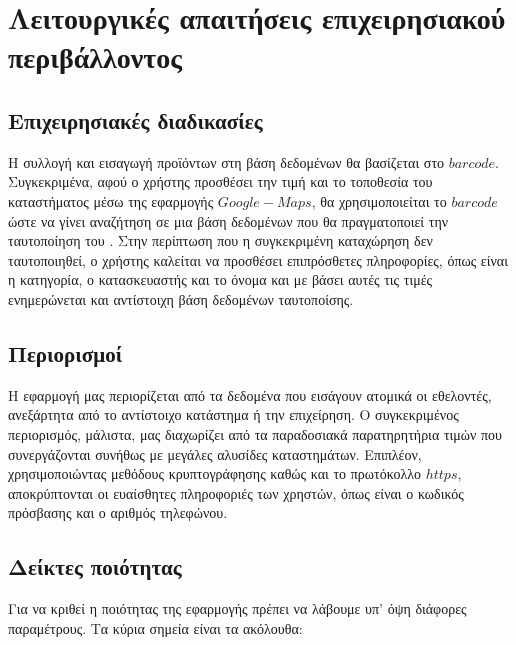 \documentclass[12pt]{article}
\begin{document}
\section{Λειτουργικές απαιτήσεις επιχειρησιακού περιβάλλοντος}

\subsection{Επιχειρησιακές διαδικασίες}

Η συλλογή και εισαγωγή προϊόντων στη βάση δεδομένων θα βασίζεται στο $barcode$.  Συγκεκριμένα, αφού ο χρήστης προσθέσει την τιμή και το τοποθεσία του καταστήματος μέσω της εφαρμογής $Google-Maps$, θα χρησιμοποιείται το $barcode$ ώστε να γίνει αναζήτηση σε μια βάση δεδομένων που θα πραγματοποιεί την ταυτοποίηση του . Στην περίπτωση που η συγκεκριμένη καταχώρηση δεν ταυτοποιηθεί, ο χρήστης καλείται να προσθέσει επιπρόσθετες πληροφορίες, όπως είναι η κατηγορία, ο κατασκευαστής και το όνομα και με βάσει αυτές τις τιμές ενημερώνεται και αντίστοιχη βάση δεδομένων ταυτοποίσης.

\subsection{Περιορισμοί}

Η εφαρμογή μας περιορίζεται από τα δεδομένα που εισάγουν ατομικά οι εθελοντές, ανεξάρτητα από το αντίστοιχο κατάστημα ή την επιχείρηση. Ο συγκεκριμένος περιορισμός, μάλιστα, μας διαχωρίζει από τα παραδοσιακά παρατηρητήρια τιμών που συνεργάζονται συνήθως με μεγάλες αλυσίδες καταστημάτων. Επιπλέον, χρησιμοποιώντας μεθόδους κρυπτογράφησης καθώς και το πρωτόκολλο $https$, αποκρύπτονται οι ευαίσθητες πληροφοριές των χρηστών, όπως είναι ο κωδικός πρόσβασης και ο αριθμός τηλεφώνου. 


\subsection{Δείκτες ποιότητας}

Για να κριθεί η ποιότητας της εφαρμογής πρέπει να λάβουμε υπ' όψη διάφορες παραμέτρους. Τα κύρια σημεία είναι τα ακόλουθα:
	
\end{document}
